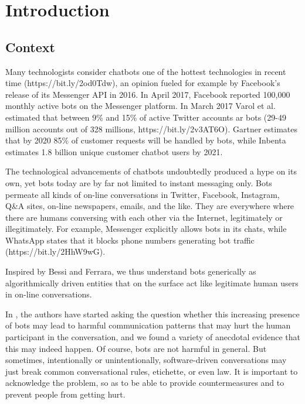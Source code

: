\chapter{Introduction}
\label{Introduction}
\thispagestyle{empty}


\section{Context}
Many technologists consider chatbots one of the hottest technologies in recent time (https://bit.ly/2od0Tdw), an opinion fueled for example by Facebook’s release of its Messenger API in 2016. In April 2017, Facebook reported 100,000 monthly active bots on the Messenger platform. In March 2017 Varol et al.\cite{Varol} estimated that between 9\% and 15\% of active Twitter accounts ar bots (29-49 million accounts out of 328 millions, https://bit.ly/2v3AT6O). Gartner estimates that by 2020 85\% of customer requests will be handled by bots, while Inbenta estimates 1.8 billion unique customer chatbot users by 2021.\cite{inbenta}

The technological advancements of chatbots undoubtedly produced a hype on its own, yet bots today are by far not limited to instant messaging only. Bots permeate all kinds of on-line conversations in Twitter, Facebook, Instagram, Q\&A sites, on-line newspapers, emails, and the like. They are everywhere where there are humans conversing with each other via the Internet, legitimately or illegitimately. For example, Messenger explicitly allows bots in its chats, while WhatsApp states that it blocks phone numbers generating bot traffic (https://bit.ly/2HhW9wG).

Inspired by Bessi and Ferrara, \cite{bessi} we thus understand bots generically as algorithmically driven entities that on the surface act like legitimate human users in on-line conversations.

In \cite{DanielIC2019}, the authors have started asking the question whether this increasing presence of bots may lead to harmful communication patterns that may hurt the human participant in the conversation, and we found a variety of anecdotal evidence that this may indeed happen. Of course, bots are not harmful in general. But sometimes, intentionally or unintentionally, software-driven conversations may just break common conversational rules, etichette, or even law. It is important to acknowledge the problem, so as to be able to provide countermeasures and to prevent people from getting hurt.

